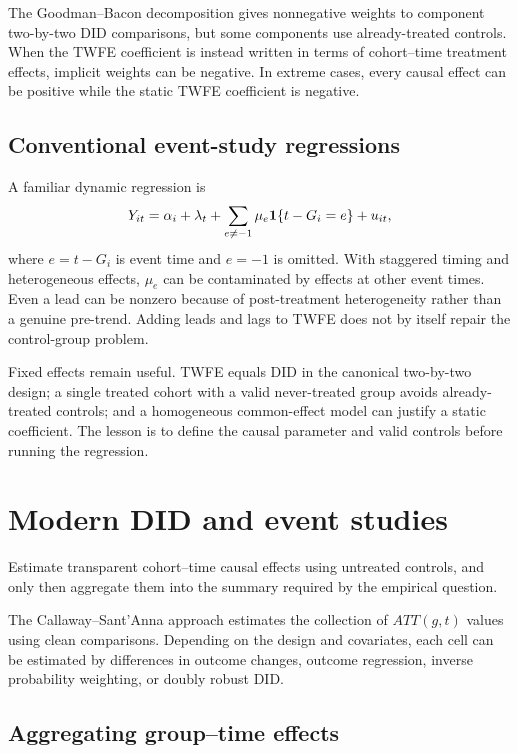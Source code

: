 The Goodman--Bacon decomposition gives nonnegative weights to component
two-by-two DID comparisons, but some components use already-treated controls.
When the TWFE coefficient is instead written in terms of cohort--time treatment
effects, implicit weights can be negative.  In extreme cases, every causal
effect can be positive while the static TWFE coefficient is negative.

\subsection{Conventional event-study regressions}

A familiar dynamic regression is
\begin{equation}
  Y_{it}=\alpha_i+\lambda_t+
  \sum_{e\neq-1}\mu_e\mathbf{1}\{t-G_i=e\}+u_{it},
  \label{eq:did-conventional-event-study}
\end{equation}
where $e=t-G_i$ is event time and $e=-1$ is omitted.  With staggered timing and
heterogeneous effects, $\mu_e$ can be contaminated by effects at other event
times.  Even a lead can be nonzero because of post-treatment heterogeneity
rather than a genuine pre-trend.  Adding leads and lags to TWFE does not by
itself repair the control-group problem.

Fixed effects remain useful.  TWFE equals DID in the canonical two-by-two
design; a single treated cohort with a valid never-treated group avoids
already-treated controls; and a homogeneous common-effect model can justify a
static coefficient.  The lesson is to define the causal parameter and valid
controls before running the regression.

\section{Modern DID and event studies}
\label{sec:did-modern}

\begin{important}
Estimate transparent cohort--time causal effects using untreated controls, and
only then aggregate them into the summary required by the empirical question.
\end{important}

The Callaway--Sant'Anna approach estimates the collection of $ATT(g,t)$ values
using clean comparisons.  Depending on the design and covariates, each cell can
be estimated by differences in outcome changes, outcome regression, inverse
probability weighting, or doubly robust DID.

\subsection{Aggregating group--time effects}

